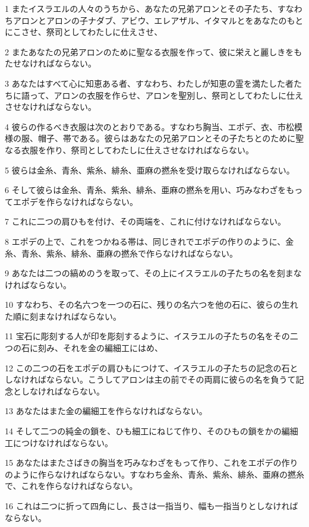 \par 1 またイスラエルの人々のうちから、あなたの兄弟アロンとその子たち、すなわちアロンとアロンの子ナダブ、アビウ、エレアザル、イタマルとをあなたのもとにこさせ、祭司としてわたしに仕えさせ、
\par 2 またあなたの兄弟アロンのために聖なる衣服を作って、彼に栄えと麗しきをもたせなければならない。
\par 3 あなたはすべて心に知恵ある者、すなわち、わたしが知恵の霊を満たした者たちに語って、アロンの衣服を作らせ、アロンを聖別し、祭司としてわたしに仕えさせなければならない。
\par 4 彼らの作るべき衣服は次のとおりである。すなわち胸当、エポデ、衣、市松模様の服、帽子、帯である。彼らはあなたの兄弟アロンとその子たちとのために聖なる衣服を作り、祭司としてわたしに仕えさせなければならない。
\par 5 彼らは金糸、青糸、紫糸、緋糸、亜麻の撚糸を受け取らなければならない。
\par 6 そして彼らは金糸、青糸、紫糸、緋糸、亜麻の撚糸を用い、巧みなわざをもってエポデを作らなければならない。
\par 7 これに二つの肩ひもを付け、その両端を、これに付けなければならない。
\par 8 エポデの上で、これをつかねる帯は、同じきれでエポデの作りのように、金糸、青糸、紫糸、緋糸、亜麻の撚糸で作らなければならない。
\par 9 あなたは二つの縞めのうを取って、その上にイスラエルの子たちの名を刻まなければならない。
\par 10 すなわち、その名六つを一つの石に、残りの名六つを他の石に、彼らの生れた順に刻まなければならない。
\par 11 宝石に彫刻する人が印を彫刻するように、イスラエルの子たちの名をその二つの石に刻み、それを金の編細工にはめ、
\par 12 この二つの石をエポデの肩ひもにつけて、イスラエルの子たちの記念の石としなければならない。こうしてアロンは主の前でその両肩に彼らの名を負うて記念としなければならない。
\par 13 あなたはまた金の編細工を作らなければならない。
\par 14 そして二つの純金の鎖を、ひも細工にねじて作り、そのひもの鎖をかの編細工につけなければならない。
\par 15 あなたはまたさばきの胸当を巧みなわざをもって作り、これをエポデの作りのように作らなければならない。すなわち金糸、青糸、紫糸、緋糸、亜麻の撚糸で、これを作らなければならない。
\par 16 これは二つに折って四角にし、長さは一指当り、幅も一指当りとしなければならない。
